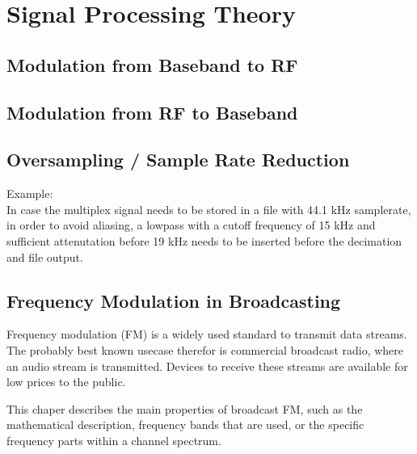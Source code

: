 \chapter{Signal Processing Theory}
\label{cha:TheThesis}

\section{Modulation from Baseband to RF}

\section{Modulation from RF to Baseband}

\section{Oversampling / Sample Rate Reduction}
Example: \\
In case the multiplex signal needs to be stored in a file with 44.1 kHz samplerate, in order to avoid aliasing, a lowpass with a cutoff frequency of 15 kHz and sufficient attenutation before 19 kHz needs to be inserted before the decimation and file output.

\section{Frequency Modulation in Broadcasting}

Frequency modulation (FM) is a widely used standard to transmit data streams.
The probably best known usecase therefor is commercial broadcast radio, where an audio stream is transmitted.
Devices to receive these streams are available for low prices to the public.

This chaper describes the main properties of broadcast FM, such as the mathematical description, frequency bands that are used, or the specific frequency parts within a channel spectrum.

